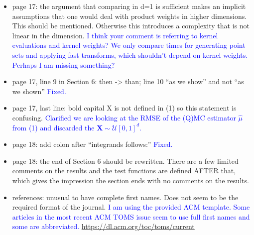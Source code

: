 \documentclass{article}
\newcommand{\response}[1]{{\newline \textcolor{blue}{#1}}}
\newcommand{\rbullet}{\textcolor{red}{\textbullet}}
\newcommand{\fixed}{\response{Fixed.}}
\begin{document}
\begin{itemize}
    \response{They are now introduced as properties of the two formulations rather than assumptions.} 
    \item page 17: the argument that comparing in d=1 is sufficient makes an implicit assumptions that one would deal with product weights in higher dimensions. This should be mentioned. Otherwise this introduces a complexity that is not linear in the dimension.
    \response{I think your comment is referring to kernel evaluations and kernel weights? We only compare times for generating point sets and applying fast transforms, which shouldn't depend on kernel weights. Perhaps I am missing something?} 
    \item page 17, line 9 in Section 6: then -> than; line 10 “as we show” and not “as we shown”
    \fixed 
    \item page 17, last line: bold capital X is not defined in (1) so this statement is confusing.
    \response{Clarified we are looking at the  RMSE of the (Q)MC estimator $\hat{\mu}$ from (1) and discarded the $\boldsymbol{X} \sim \mathcal{U}[0,1]^d$.}
    \item page 18: add colon after ``integrands follows:''
    \fixed
    \item[\rbullet] page 18: the end of Section 6 should be rewritten. There are a few limited comments on the results and the test functions are defined AFTER that, which gives the impression the section ends with no comments on the results.
    \item references: unusual to have complete first names. Does not seem to be the required format of the journal.
    \response{I am using the provided ACM template. Some articles in the most recent ACM TOMS issue seem to use full first names and some are abbreviated.}
    \response{\url{https://dl.acm.org/toc/toms/current}} 
\end{itemize}
\end{document}
